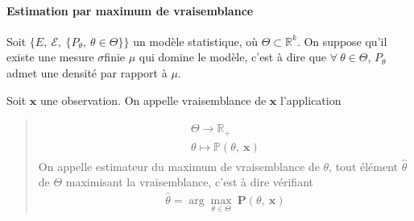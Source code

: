 \documentclass[letterpaper,11pt,english]{sphinxmanual}
\begin{document}
\paragraph{Estimation par maximum de vraisemblance}
\label{\detokenize{chapter2:estimation-par-maximum-de-vraisemblance}}
\begin{DUlineblock}{0em}
\item[] Soit \(\{E,\ \mathcal{E},\ \{P_{\theta},\ \theta\in\Theta\}\}\) un
modèle statistique, où \(\Theta\subset\mathbb{R}^k\). On suppose
qu’il existe une mesure \(\sigma\)\sphinxhyphen{}finie \(\mu\) qui domine le
modèle, c’est à dire que \(\forall\  \theta\in\Theta\),
\(P_{\theta}\) admet une densité par rapport à \(\mu\).
\item[] 
\item[] Soit \(\mathbf{x}\) une observation. On appelle vraisemblance de
\(\mathbf{x}\) l’application
\end{DUlineblock}
\begin{quote}
\begin{equation}\label{equation:chapter2:chapter2:68}
\begin{split}\begin{array}{l}
    \Theta \rightarrow\mathbb{R}_+ \\
    \theta \mapsto \mathbb{P}(\theta,\ \mathbf{x})
    \end{array}\end{split}
\end{equation}
\sphinxAtStartPar
On appelle estimateur du maximum de vraisemblance de \(\theta\),
tout élément \(\hat{\theta}\) de \(\Theta\) maximisant la
vraisemblance, c’est à dire vérifiant
\begin{equation}\label{equation:chapter2:chapter2:69}
\begin{split}\hat{\theta} = \arg \underset{\theta\in\Theta}{\max}\  \mathbf{P}(\theta,\ \mathbf{x})\end{split}
\end{equation}\end{quote}
\end{document}
